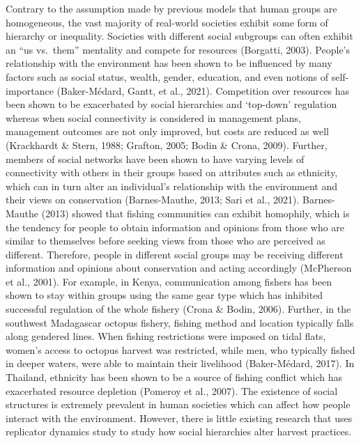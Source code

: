 \documentclass[
  12pt,
]{article}
\begin{document}
Contrary to the assumption made by previous models that human groups are homogeneous, the vast majority of real-world societies exhibit some form of hierarchy or inequality. Societies with different social subgroups can often exhibit an ``us vs.~them'' mentality and compete for resources (Borgatti, 2003). People's relationship with the environment has been shown to be influenced by many factors such as social status, wealth, gender, education, and even notions of self-importance (Baker-Médard, Gantt, et al., 2021). Competition over resources has been shown to be exacerbated by social hierarchies and `top-down' regulation whereas when social connectivity is considered in management plans, management outcomes are not only improved, but costs are reduced as well (Krackhardt \& Stern, 1988; Grafton, 2005; Bodin \& Crona, 2009). Further, members of social networks have been shown to have varying levels of connectivity with others in their groups based on attributes such as ethnicity, which can in turn alter an individual's relationship with the environment and their views on conservation (Barnes-Mauthe, 2013; Sari et al., 2021). Barnes-Mauthe (2013) showed that fishing communities can exhibit homophily, which is the tendency for people to obtain information and opinions from those who are similar to themselves before seeking views from those who are perceived as different. Therefore, people in different social groups may be receiving different information and opinions about conservation and acting accordingly (McPherson et al., 2001). For example, in Kenya, communication among fishers has been shown to stay within groups using the same gear type which has inhibited successful regulation of the whole fishery (Crona \& Bodin, 2006). Further, in the southwest Madagascar octopus fishery, fishing method and location typically falls along gendered lines. When fishing restrictions were imposed on tidal flats, women's access to octopus harvest was restricted, while men, who typically fished in deeper waters, were able to maintain their livelihood (Baker-Médard, 2017). In Thailand, ethnicity has been shown to be a source of fishing conflict which has exacerbated resource depletion (Pomeroy et al., 2007). The existence of social structures is extremely prevalent in human societies which can affect how people interact with the environment. However, there is little existing research that uses replicator dynamics study to study how social hierarchies alter harvest practices.
\end{document}
